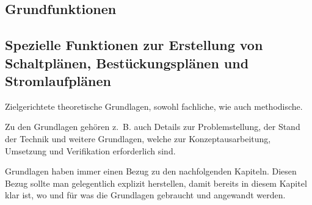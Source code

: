\subsection{Grundfunktionen}
\subsection{Spezielle Funktionen zur Erstellung von Schaltplänen, Bestückungsplänen und Stromlaufplänen}


Zielgerichtete theoretische Grundlagen, sowohl fachliche, wie auch methodische.

Zu den Grundlagen gehören z.~B. auch Details zur Problemstellung, der Stand der Technik und weitere Grundlagen, welche zur Konzeptausarbeitung, Umsetzung und Verifikation erforderlich sind.

Grundlagen haben immer einen Bezug zu den nachfolgenden Kapiteln. Diesen Bezug sollte man gelegentlich explizit herstellen, damit bereits in diesem Kapitel klar ist, wo und für was die Grundlagen gebraucht und angewandt werden.